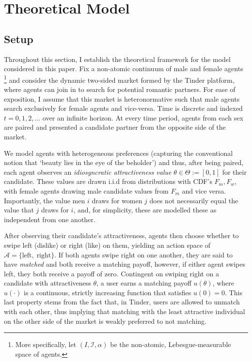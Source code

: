 \section{Theoretical Model}
\label{sec:section2}
\subsection{Setup}\label{sec:section2.1} 
Throughout this section, I establish the theoretical framework for the model considered in this paper. Fix a non-atomic continuum of male and female agents \footnote{More specifically, let  $(I, \mathcal{I}, \alpha)$ be the non-atomic,  Lebesgue-measurable space of agents.} and consider the dynamic two-sided market formed by the Tinder platform, where agents can join in to search for potential romantic partners. 
For ease of exposition, I assume that this market is heteronormative such that male agents search exclusively for female agents and vice-versa. 
Time is discrete and indexed $t=0, 1, 2, ...$ over an infinite horizon. 
At every time period, agents from each sex are paired and presented a candidate partner from the opposite side of the market. 
\begin{comment}
    Each agent has an attractiveness type $\theta \in \Theta := [0,1]$ which is unknown to them but observable to their candidate, and it is common knowledge that this is the case.
\end{comment}
We model agents with heterogeneous preferences (capturing the conventional notion that `beauty lies in the eye of the beholder') and thus, after being paired, each agent observes an \textit{idiosyncratic attractiveness value} $\theta \in \Theta := [0,1]$ for their candidate. These values are drawn i.i.d from distributions with CDF's $F_m, F_w$, with female agents drawing male candidate values from $F_m$ and vice versa. Importantly, the value men $i$ draws for women $j$ does not necessarily equal the value that $j$ draws for $i$, and, for simplicity, these are modelled these as independent from one another.

After observing their candidate's attractiveness, agents then choose whether to swipe left (dislike) or right (like) on them, yielding an action space of $\mathcal{A}=\{ \text{left},\; \text{right}\}$. 
If both agents swipe right on one another, they are said to have \textit{matched} and both receive a matching payoff, however, if either agent swipes left, they both receive a payoff of zero. Contingent on swiping right on a candidate with attractiveness $\theta$, a user earns a matching payoff $u(\theta)$, where $u(\cdot)$ is a continuous, strictly increasing function that satisfies $u(0) = 0$. 
This last property stems from the fact that, in Tinder, users are allowed to unmatch with each other, thus implying that matching with the least attractive individual on the other side of the market is weakly preferred to not matching. 

